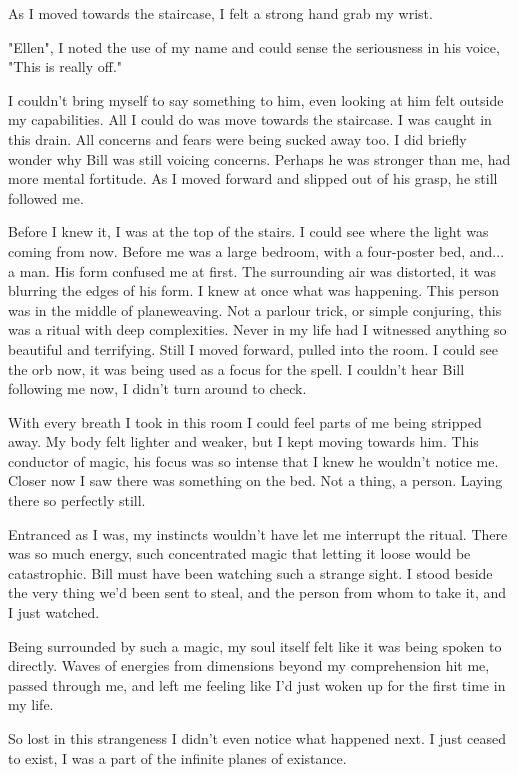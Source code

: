 As I moved towards the staircase, I felt a strong hand grab my wrist.

\begin{dialogue}
    \item{"Ellen", I noted the use of my name and could sense the seriousness in his voice, "This is really off."}
\end{dialogue}

I couldn't bring myself to say something to him, even looking at him felt
outside my capabilities. All I could do was move towards the staircase. I was
caught in this drain. All concerns and fears were being sucked away too. I did
briefly wonder why Bill was still voicing concerns. Perhaps he was stronger than
me, had more mental fortitude. As I moved forward and slipped out of his grasp,
he still followed me.

Before I knew it, I was at the top of the stairs. I could see where the light
was coming from now. Before me was a large bedroom, with a four-poster bed,
and... a man. His form confused me at first. The surrounding air was distorted, it
was blurring the edges of his form. I knew at once what was happening. This
person was in the middle of planeweaving. Not a parlour trick, or simple
conjuring, this was a ritual with deep complexities. Never in my life had I
witnessed anything so beautiful and terrifying. Still I moved forward, pulled
into the room. I could see the orb now, it was being used as a focus for the
spell. I couldn't hear Bill following me now, I didn't turn around to check. 

With every breath I took in this room I could feel parts of me being stripped
away. My body felt lighter and weaker, but I kept moving towards him. This
conductor of magic, his focus was so intense that I knew he wouldn't notice me.
Closer now I saw there was something on the bed. Not a thing, a person. Laying
there so perfectly still. 

Entranced as I was, my instincts wouldn't have let me interrupt the ritual.
There was so much energy, such concentrated magic that letting it loose would be
catastrophic. Bill must have been watching such a strange sight. I stood beside
the very thing we'd been sent to steal, and the person from whom to take it, and
I just watched. 

Being surrounded by such a magic, my soul itself felt like it was being spoken
to directly. Waves of energies from dimensions beyond my comprehension hit me,
passed through me, and left me feeling like I'd just woken up for the first time
in my life. 

So lost in this strangeness I didn't even notice what happened next. I just
ceased to exist, I was a part of the infinite planes of existance.

